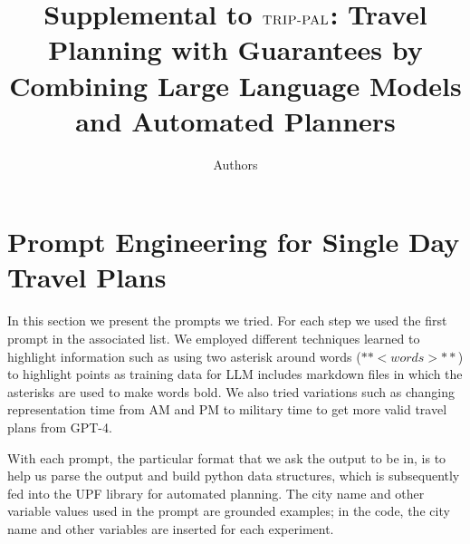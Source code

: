 \documentclass[doubleblind]{ecai}
\newcommand{\gpt}{{\sc GPT-4}\xspace}
\newcommand{\approach}{\ensuremath{\textsc{TRIP-PAL}}\xspace}
\begin{document}
%

\begin{frontmatter}
\title{Supplemental to \approach: Travel Planning with Guarantees by Combining Large Language Models and Automated Planners}
\author{Authors}



\end{frontmatter}






\section{ Prompt Engineering for Single Day Travel Plans}
In this section we present the prompts we tried. For each step we used the first prompt in the associated list. 
We employed different techniques learned to highlight information such as using two asterisk around words ($**<words>**$) to highlight points as training data for LLM includes markdown files in which the asterisks are used to make words bold. We also tried variations such as changing representation time from AM and PM to military time to get more valid travel plans from \gpt.

With each prompt, the particular format that we ask the output to be in, is to help us parse the output and build python data structures, which is subsequently fed into the UPF library for automated planning. The city name and other variable values used in the prompt are grounded examples; in the code, the city name and other variables are inserted for each experiment.
\end{document}

